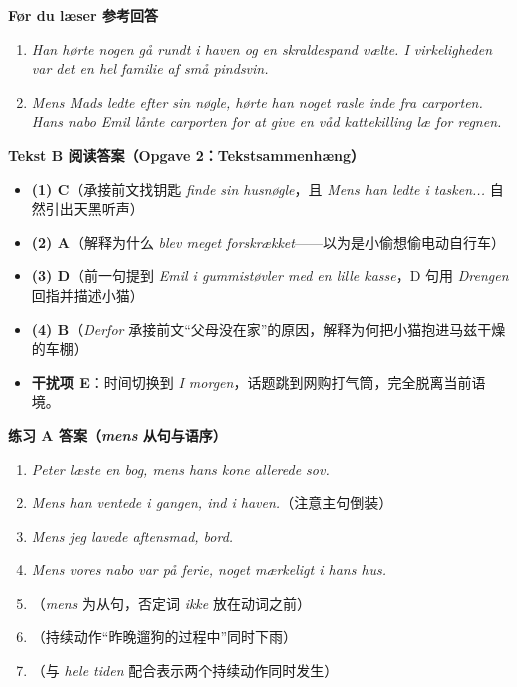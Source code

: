 \begin{answerbox}
\textbf{Før du læser 参考回答}
\begin{enumerate}
  \item \textit{Han hørte nogen gå rundt i haven og en skraldespand vælte. I virkeligheden var det en hel familie af små pindsvin.}
  \item \textit{Mens Mads ledte efter sin nøgle, hørte han noget rasle inde fra carporten. Hans nabo Emil lånte carporten for at give en våd kattekilling læ for regnen.}
\end{enumerate}

\textbf{Tekst B 阅读答案（Opgave 2：Tekstsammenhæng）}
\begin{itemize}
  \item \textbf{(1) C}（承接前文找钥匙 \textit{finde sin husnøgle}，且 \textit{Mens han ledte i tasken...} 自然引出天黑听声）
  \item \textbf{(2) A}（解释为什么 \textit{blev meget forskrækket}——以为是小偷想偷电动自行车）
  \item \textbf{(3) D}（前一句提到 \textit{Emil i gummistøvler med en lille kasse}，D 句用 \textit{Drengen} 回指并描述小猫）
  \item \textbf{(4) B}（\textit{Derfor} 承接前文“父母没在家”的原因，解释为何把小猫抱进马兹干燥的车棚）
  \item \textbf{干扰项 E}：时间切换到 \textit{I morgen}，话题跳到网购打气筒，完全脱离当前语境。
\end{itemize}

\textbf{练习 A 答案（\textit{mens} 从句与语序）}
\begin{enumerate}
  \item \textit{Peter læste en bog, mens hans kone allerede sov.}
  \item \textit{Mens han ventede i gangen,  ind i haven.}（注意主句倒装）
  \item \textit{Mens jeg lavede aftensmad,  bord.}
  \item \textit{Mens vores nabo var på ferie,  noget mærkeligt i hans hus.}
  \item {}（\textit{mens} 为从句，否定词 \textit{ikke} 放在动词之前）
  \item {}（持续动作“昨晚遛狗的过程中”同时下雨）
  \item {}（与 \textit{hele tiden} 配合表示两个持续动作同时发生）
\end{enumerate}


\end{answerbox}
